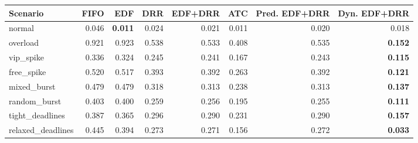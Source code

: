 \begin{tabular}{lrrrrrrr}
\toprule
Scenario & FIFO & EDF & DRR & EDF+DRR & ATC & Pred. EDF+DRR & Dyn. EDF+DRR \\
\midrule
normal & 0.046 & \textbf{0.011} & 0.024 & 0.021 & 0.011 & 0.020 & 0.018 \\
overload & 0.921 & 0.923 & 0.538 & 0.533 & 0.408 & 0.535 & \textbf{0.152} \\
vip\_spike & 0.336 & 0.324 & 0.245 & 0.241 & 0.167 & 0.243 & \textbf{0.115} \\
free\_spike & 0.520 & 0.517 & 0.393 & 0.392 & 0.263 & 0.392 & \textbf{0.121} \\
mixed\_burst & 0.479 & 0.479 & 0.318 & 0.313 & 0.238 & 0.313 & \textbf{0.137} \\
random\_burst & 0.403 & 0.400 & 0.259 & 0.256 & 0.195 & 0.255 & \textbf{0.111} \\
tight\_deadlines & 0.387 & 0.365 & 0.296 & 0.290 & 0.231 & 0.290 & \textbf{0.157} \\
relaxed\_deadlines & 0.445 & 0.394 & 0.273 & 0.271 & 0.156 & 0.272 & \textbf{0.033} \\
\bottomrule
\end{tabular}
